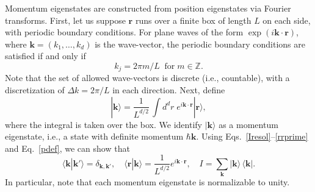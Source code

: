 \documentclass[pra,12pt]{revtex4-2}
\begin{document}
Momentum eigenstates are constructed from position eigenstates via
Fourier transforms.  First, let us suppose $\mathbf{r}$ runs over a
finite box of length $L$ on each side, with periodic boundary
conditions.  For plane waves of the form
$\exp(i\mathbf{k}\cdot\mathbf{r})$, where $\mathbf{k} = (k_1, \dots,
k_d)$ is the wave-vector, the periodic boundary conditions are
satisfied if and only if
\begin{equation}
  k_j = 2\pi m/L\;\;\mathrm{for} \;m\in\mathbb{Z}.
\end{equation}
Note that the set of allowed wave-vectors is discrete (i.e.,
countable), with a discretization of $\Delta k = 2\pi/L$ in each
direction.  Next, define
\begin{equation}
  |\mathbf{k}\rangle = \frac{1}{L^{d/2}} \, \int d^dr \; e^{i\mathbf{k}\cdot\mathbf{r}} |\mathbf{r}\rangle,
  \label{pdef}
\end{equation}
where the integral is taken over the box.  We identify
$|\mathbf{k}\rangle$ as a momentum eigenstate, i.e., a state with
definite momentum $\hbar \mathbf{k}$.  Using
Eqs.~\eqref{Iresol}--\eqref{rrprime} and Eq.~\eqref{pdef}, we can show
that
\begin{equation}
  \langle\mathbf{k}|\mathbf{k}'\rangle = \delta_{\mathbf{k},\mathbf{k}'}, \quad \langle\mathbf{r}|\mathbf{k}\rangle = \frac{1}{L^{d/2}} e^{i\mathbf{k}\cdot\mathbf{r}}, \quad I = \sum_{\mathbf{k}} |\mathbf{k}\rangle\,\langle\mathbf{k}|.
\end{equation}
In particular, note that each momentum eigenstate is normalizable to
unity.
\end{document}
